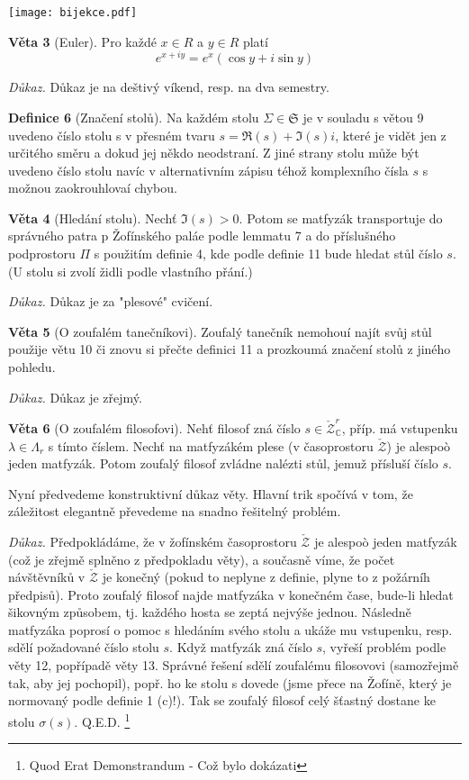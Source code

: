 \documentclass[12pt,a4paper]{article}
\begin{document}
\begin{center}
\texttt{[image: bijekce.pdf]}
\end{center}

\textbf{Věta 3} (Euler). Pro každé $x \in R$ a $y \in R$ platí
$$
e^{x+iy} = e^x (\cos y + i \sin y) 
$$
\par
\textit{Důkaz.}
Důkaz je na deštivý víkend, resp. na dva semestry.


\textbf{Definice 6}
(Značení stolů).
Na každém stolu $\Sigma \in \mathfrak{S}$ je v souladu s větou 9 uvedeno
číslo stolu s v přesném tvaru $s = \Re(s) + \Im(s) i$, které je vidět jen z určitého směru a dokud
jej někdo neodstraní. Z jiné strany stolu může být uvedeno číslo stolu navíc v alternativním
zápisu téhož komplexního čísla $s$ s možnou zaokrouhlovaí chybou.


\textbf{Věta 4}
(Hledání stolu).
Nechť $\Im(s) > 0$. Potom se matfyzák transportuje do správného
patra p Žofínského paláe podle lemmatu 7 a do příslušného podprostoru $\Pi$ s použitím
definie 4, kde podle definie 11 bude hledat stůl číslo $s$. (U stolu si zvolí židli podle
vlastního přání.)
\par
\textit{Důkaz.}
Důkaz je za "plesové" cvičení.


\textbf{Věta 5}
(O zoufalém tanečníkovi).
Zoufalý tanečník nemohouí najít svůj stůl použije
větu 10 či znovu si přečte definici 11 a prozkoumá značení stolů z jiného pohledu.
\par
\textit{Důkaz.}
Důkaz je zřejmý.


\textbf{Věta 6} (O zoufalém filosofovi). Nehť filosof zná číslo $s \in \check{\mathcal{Z}}^r_{\mathds{C}}$,
příp. má vstupenku $\lambda \in \Lambda_r$ s tímto číslem. Nechť na matfyzákém plese (v časoprostoru $\check{\mathcal{Z}}$)
je alespoò jeden matfyzák. Potom zoufalý filosof zvládne nalézti stůl, jemuž přísluší číslo $s$.
\par
Nyní předvedeme konstruktivní důkaz věty. Hlavní trik spočívá v tom, že záležitost
elegantně převedeme na snadno řešitelný problém.
\par
\textit{Důkaz.}
Předpokládáme, že v žofínském časoprostoru $\check{\mathcal{Z}}$ je alespoò jeden matfyzák
(což je zřejmě splněno z předpokladu věty), a současně víme,
že počet návštěvníků v $\check{\mathcal{Z}}$ je konečný
(pokud to neplyne z definie, plyne to z požárníh předpisů). Proto zoufalý filosof najde
matfyzáka v konečném čase, bude-li hledat šikovným způsobem, tj. každého hosta se zeptá
nejvýše jednou. Následně matfyzáka poprosí o pomoc s hledáním svého stolu a ukáže mu
vstupenku, resp. sdělí požadované číslo stolu $s$. Když matfyzák zná číslo $s$, vyřeší problém
podle věty 12, popřípadě věty 13. Správné řešení sdělí zoufalému filosovovi (samozřejmě
tak, aby jej pochopil), popř. ho ke stolu s dovede (jsme přece na Žofíně, který je normovaný
podle definie 1 (c)!). Tak se zoufalý filosof celý šťastný dostane ke stolu $\sigma(s)$. Q.E.D.
\footnote{Quod Erat Demonstrandum - Což bylo dokázati}
\end{document}
